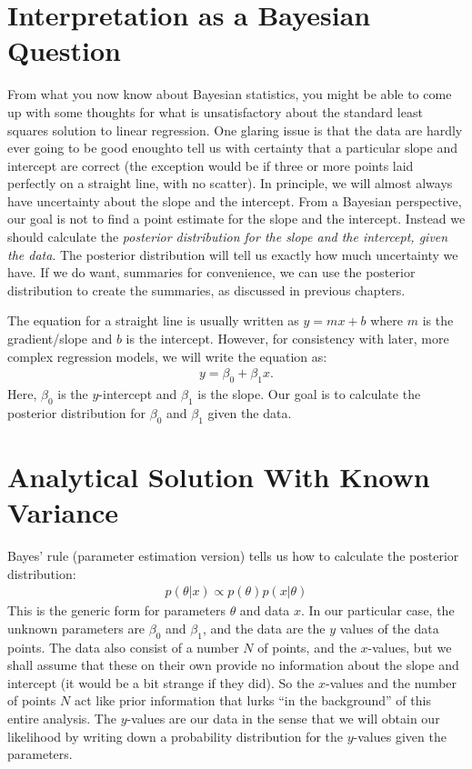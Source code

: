 \section{Interpretation as a Bayesian Question}
From what you now know about Bayesian statistics, you might be able to come up
with some thoughts for what is unsatisfactory about the standard least squares
solution to linear regression. One glaring issue is that the data are hardly ever
going to be good enoughto tell us with certainty that a particular slope and intercept
are correct (the exception would be if three or more points laid perfectly on a straight
line, with no scatter).
In principle, we will almost always have uncertainty about the slope and
the intercept. From a Bayesian perspective, our goal is not to find a point
estimate for the slope and the intercept. Instead we should calculate the
{\it posterior distribution for the slope and the intercept, given the data}.
The posterior distribution will tell us exactly how much uncertainty we have.
If we do want, summaries for convenience, we can use the posterior distribution
to create the summaries, as discussed in previous chapters.

The equation for a straight line is usually written as $y = mx + b$ where $m$
is the gradient/slope and $b$ is the intercept. However,
for consistency with later, more complex regression models, we will write the
equation as:
\begin{eqnarray}
y = \beta_0 + \beta_1 x.
\end{eqnarray}
Here, $\beta_0$ is the $y$-intercept and $\beta_1$ is the slope. Our goal is
to calculate the posterior distribution for $\beta_0$ and $\beta_1$ given the
data.

\section{Analytical Solution With Known Variance}
Bayes' rule (parameter estimation version) tells us how to calculate the
posterior distribution:
\begin{eqnarray}
p(\theta|x) \propto p(\theta)p(x|\theta)
\end{eqnarray}
This is the generic form for parameters $\theta$ and data
$x$. In our particular case, the
unknown parameters are $\beta_0$ and $\beta_1$, and the data are the
$y$ values of the data points. The data also consist of a number $N$ of points,
and the $x$-values,
but we shall assume that these on their own provide no information about the
slope and intercept (it would be a bit strange if they did). So the $x$-values
and the number of points $N$ act like prior information that lurks ``in the
background'' of this entire analysis. The $y$-values are our data in the sense
that we will obtain our likelihood by writing down a probability distribution
for the $y$-values given the parameters.

